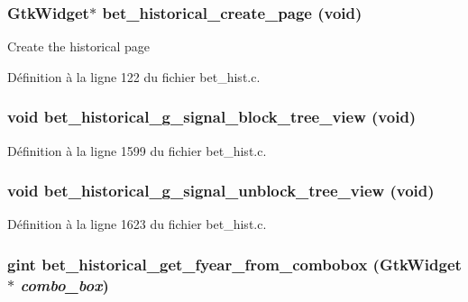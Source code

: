 \subsubsection[{bet\_\-historical\_\-create\_\-page}]{\setlength{\rightskip}{0pt plus 5cm}GtkWidget$\ast$ bet\_\-historical\_\-create\_\-page (void)}\label{bet__hist_8c_a339ca48839f4c4ed5480bd2d36822c9c}
Create the historical page 

Définition à la ligne 122 du fichier bet\_\-hist.c.

\subsubsection[{bet\_\-historical\_\-g\_\-signal\_\-block\_\-tree\_\-view}]{\setlength{\rightskip}{0pt plus 5cm}void bet\_\-historical\_\-g\_\-signal\_\-block\_\-tree\_\-view (void)}\label{bet__hist_8c_adf6e0f9c8fad1ccf20cf59f847952694}


Définition à la ligne 1599 du fichier bet\_\-hist.c.

\subsubsection[{bet\_\-historical\_\-g\_\-signal\_\-unblock\_\-tree\_\-view}]{\setlength{\rightskip}{0pt plus 5cm}void bet\_\-historical\_\-g\_\-signal\_\-unblock\_\-tree\_\-view (void)}\label{bet__hist_8c_abdc34191d350f48a5dfa2aab50e813d5}


Définition à la ligne 1623 du fichier bet\_\-hist.c.

\subsubsection[{bet\_\-historical\_\-get\_\-fyear\_\-from\_\-combobox}]{\setlength{\rightskip}{0pt plus 5cm}gint bet\_\-historical\_\-get\_\-fyear\_\-from\_\-combobox (GtkWidget $\ast$ {\em combo\_\-box})}\label{bet__hist_8c_abcb09aee0aaff63d36a2da702ad4520b}


